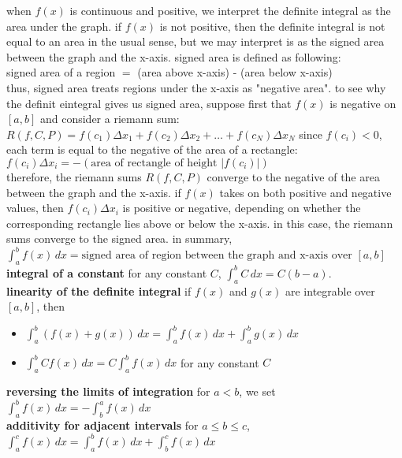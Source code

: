 \documentclass{article}
\begin{document}
when $f(x)$ is continuous and positive, we interpret the definite integral as the area under the graph. if $f(x)$ is not positive, then the definite integral is not equal to an area in the usual sense, but we may interpret is as the signed area between the graph and the x-axis. signed area is defined as following:\\
signed area of a region $=$ (area above x-axis) - (area below x-axis)\\

thus, signed area treats regions under the x-axis as "negative area". to see why the definit eintegral gives us signed area, suppose first that $f(x)$ is negative on $[a, b]$ and consider a riemann sum: $R(f, C, P) = f(c_1)\Delta x_1 + f(c_2)\Delta x_2 + \ldots + f(c_N)\Delta x_N$ since $f(c_i) < 0$, each term is equal to the negative of the area of a rectangle: $f(c_i)\Delta x_i = -(\text{area of rectangle of height }\lvert f(c_i)\rvert)$\\

therefore, the riemann sums $R(f, C, P)$ converge to the negative of the area between the graph and the x-axis. if $f(x)$ takes on both positive and negative values, then $f(c_i)\Delta x_i$ is positive or negative, depending on whether the corresponding rectangle lies above or below the x-axis. in this case, the riemann sums converge to the signed area. in summary,\\
$\int_{a}^{b}f(x)\, dx = \text{signed area of region between the graph and x-axis over } [a, b]$\\

\textbf{integral of a constant} for any constant $C$, $\int_{a}^{b}C\,dx = C(b - a)$.\\

\textbf{linearity of the definite integral} if $f(x)$ and $g(x)$ are integrable over $[a, b]$, then
	\begin{itemize}
		\item $\int_{a}^{b}(f(x) + g(x))\,dx = \int_{a}^{b}f(x)\,dx + \int_{a}^{b}g(x)\,dx$
		\item $\int_{a}^{b}Cf(x)\,dx = C\int_{a}^{b}f(x)\,dx$ for any constant $C$
	\end{itemize}

\textbf{reversing the limits of integration} for $a < b$, we set $\int_{a}^{b}f(x)\,dx = -\int_{b}^{a}f(x)\,dx$\\

\textbf{additivity for adjacent intervals} for $a \leq b \leq c$,\\
$ \int_{a}^{c}f(x)\,dx  = \int_{a}^{b}f(x)\,dx + \int_{b}^{c}f(x)\,dx$\\
\end{document}
